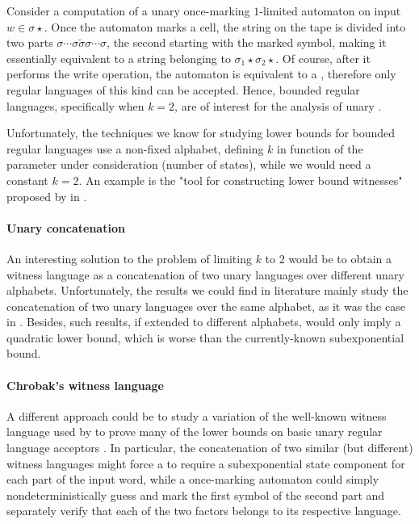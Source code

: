Consider a computation of a unary once-marking $1$-limited automaton on input $w\in\sigma\star$.
Once the automaton marks a cell, the string on the tape is divided into two parts $\sigma\cdots\sigma \tilde\sigma \sigma\cdots\sigma$, the second starting with the marked symbol, making it essentially equivalent to a string belonging to $\sigma_1\star\sigma_2\star$.
Of course, after it performs the write operation, the automaton is equivalent to a \TNFA, therefore only regular languages of this kind can be accepted.
Hence, bounded regular languages, specifically when $k=2$, are of interest for the analysis of unary \OMOLA.

Unfortunately, the techniques we know for studying lower bounds for bounded regular languages use a non-fixed alphabet, defining $k$ in function of the parameter under consideration (number of states), while we would need a constant $k=2$.
An example is the "tool for constructing lower bound witnesses" proposed by \citeauthor{HerKut+17} in \cite{HerKut+17}.

\paragraph{Unary concatenation} An interesting solution to the problem of limiting $k$ to $2$ would be to obtain a witness language as a concatenation of two unary languages over different unary alphabets.
Unfortunately, the results we could find in literature mainly study the concatenation of two unary languages over the same alphabet, as it was the case in \cite{YuZhu+94,PigSha02}.
Besides, such results, if extended to different alphabets, would only imply a quadratic lower bound, which is worse than the currently-known subexponential bound.

\paragraph{Chrobak's witness language} A different approach could be to study a variation of the well-known witness language used by \citeauthor{Chr86} to prove many of the lower bounds on basic unary regular language acceptors \cite{Chr86}.
In particular, the concatenation of two similar (but different) witness languages might force a \ODFA to require a subexponential state component for each part of the input word, while a once-marking automaton could simply nondeterministically guess and mark the first symbol of the second part and separately verify that each of the two factors belongs to its respective language.


